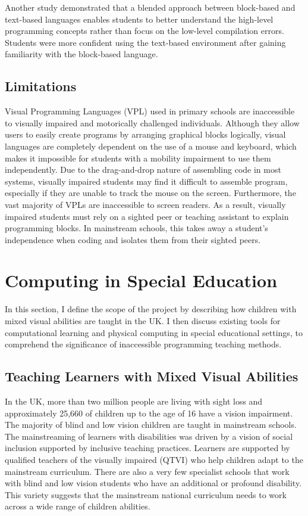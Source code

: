 \documentclass[oneside,%
                    author={Malak Hajji},
                    degree={BSc},
                    title={Designing An Accessible Computational Toolkit For Students},
                  subtitle={With Mixed Visual Abilities}]{dissertation}
\begin{document}
Another study\cite{study2-impact} demonstrated that a blended approach between block-based and text-based languages enables students to better understand the high-level programming concepts rather than focus on the low-level compilation errors. Students were more confident using the text-based environment after gaining familiarity with the block-based language. 
 
\subsection{Limitations}

Visual Programming Languages (VPL) used in primary schools are inaccessible to visually impaired and motorically challenged individuals\cite{motorical}. Although they  allow users to easily create programs by arranging graphical blocks logically, visual languages are completely dependent on the use of a mouse and keyboard, which makes it impossible for students with a mobility impairment to use them independently. Due to the drag-and-drop nature of assembling code in most systems, visually impaired students may find it difficult to assemble program, especially if they are unable to track the mouse on the screen. Furthermore, the vast majority of VPLs are inaccessible to screen readers. As a result, visually impaired students must rely on a sighted peer or teaching assistant to explain programming blocks\cite{limitations}. In mainstream schools, this takes away a student's independence when coding and isolates them from their sighted peers.


\section{Computing in Special Education}
In this section, I define the scope of the project by describing how children with mixed visual abilities are taught in the UK. I then discuss existing tools for computational learning and physical computing in special educational settings, to comprehend the significance of inaccessible programming teaching methods.

\subsection{Teaching Learners with Mixed Visual Abilities}

In the UK, more than two million people are living with sight loss and approximately 25,660 of children up to the age of 16 have a vision impairment\cite{nhs,rnib}. The majority of blind and low vision children are taught in mainstream schools\cite{rnib}. The mainstreaming of learners with disabilities was driven by a vision of social inclusion supported by inclusive teaching practices\cite{parliment}. Learners are supported by qualified teachers of the visually impaired (QTVI) who help children adapt to the mainstream curriculum. There are also a very few specialist schools that work with blind and low vision students who have an additional or profound disability. This variety suggests that the mainstream national curriculum needs to work across a wide range of children abilities. 
\end{document}
